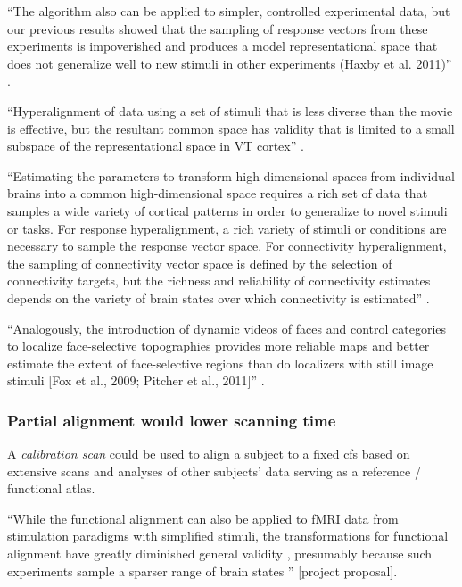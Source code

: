 %
``The algorithm also can be applied to simpler, controlled experimental data,
but our previous results showed that the sampling of response vectors from these
experiments is impoverished and produces a model representational space that
does not generalize well to new stimuli in other experiments (Haxby et al.
2011)'' \citep{guntupalli2016model}.

%
``Hyperalignment of data using a set of stimuli that is less diverse than the
movie is effective, but the resultant common space has validity that is limited
to a small subspace of the representational space in VT cortex''
\citep{haxby2011common}.

%
``Estimating the parameters to transform high-dimensional spaces from individual
brains into a common high-dimensional space requires a rich set of data that
samples a wide variety of cortical patterns in order to generalize to novel
stimuli or tasks.
%
For response hyperalignment, a rich variety of stimuli or conditions are
necessary to sample the response vector space.
%
For connectivity hyperalignment, the sampling of connectivity vector space is
defined by the selection of connectivity targets, but the richness and
reliability of connectivity estimates depends on the variety of brain states
over which connectivity is estimated'' \citep{haxby2020hyperalignment}.


%
``Analogously, the introduction of dynamic videos of faces and control
categories to localize face-selective topographies provides more reliable maps
and better estimate the extent of face-selective regions than do localizers with
still image stimuli [Fox et al., 2009; Pitcher et al., 2011]''
\citep{jiahui2020predicting}.




\subsubsection{Partial alignment would lower scanning time}
%
A \textit{calibration scan} could be used to align a subject to a fixed \ac{cfs}
based on extensive scans and analyses of other subjects' data serving as a
reference / functional atlas.

``While the functional alignment can also be applied to fMRI data from
stimulation paradigms with simplified stimuli, the transformations for
functional alignment have greatly diminished general validity
\citep{haxby2011common}, presumably because such experiments sample a sparser
range of brain states \citep{guntupalli2016model}'' [project proposal].

